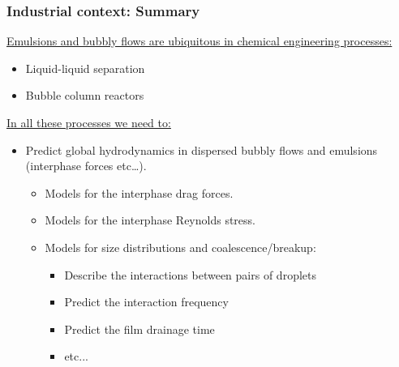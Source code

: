 \documentclass{sintefbeamer}
\begin{document}
\begin{frame}
  \frametitle{Industrial context: Summary }
  \underline{Emulsions and bubbly flows are ubiquitous in chemical engineering processes:}
  \begin{itemize}
    \item Liquid-liquid separation
    \item Bubble column reactors
  \end{itemize}
  \vfill
  \underline{In all these processes we need to: }
  \begin{itemize}
    \item Predict global hydrodynamics in dispersed bubbly flows and emulsions (interphase forces etc\ldots).
    \begin{itemize}
      \item Models for the interphase drag forces.
      \item Models for the interphase Reynolds stress.
      \item Models for size distributions and coalescence/breakup:
      \begin{itemize}
        \item Describe the interactions between pairs of droplets
        \item Predict the interaction frequency
        \item Predict the film drainage time
        \item etc...
      \end{itemize}
    \end{itemize}
  \end{itemize}

  \vfill
\end{frame}
\end{document}
